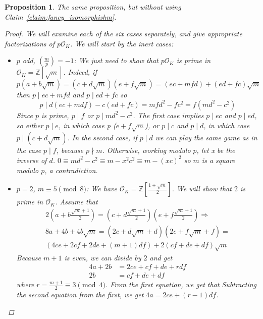 \documentclass[11pt]{article}
\newtheorem{prop}{Proposition}
\theoremstyle{definition}
\begin{document}
    \begin{prop}
        The same proposition, but without using Claim~\ref{claim:fancy_isomorphishm}.
        \begin{proof}
            We will examine each of the six cases separately, and give appropriate factorizations of $p\mathcal{O}_K$.
            We will start by the inert cases:
            \begin{itemize}

                \item $p$ odd, $\left( \frac{m}{p} \right) = -1$: We just need to show that $p \mathcal{O}_K$ is prime in $\mathcal{O}_K = \mathbb{Z}\left[\sqrt {m}\right]$.
                Indeed, if \[p\left(a+b\sqrt {m}\right) = \left(c+d\sqrt{m}\right)\left(e+f\sqrt{m}\right) = (ec + mfd) + (ed + fc)\sqrt{m}\]
                then $p \mid ec + mfd$ and $p \mid ed + fc$ so
                \[p \mid d(ec+mdf) - c(ed+fc) = mfd^2 - fc^2 = f(md^2 - c^2)\]
                Since $p$ is prime, $p \mid f$ or $p \mid md^2 - c^2$.
                The first case implies $p \mid ec$ and $p \mid ed$, so either $p \mid e$,
                in which case p \mid ($e + f \sqrt {m}$), or $p \mid c$ and $p \mid d$,
                in which case $p \mid \left(c + d \sqrt {m}\right)$.
                In the second case, if $p \mid d$ we can play the same game as in the case $p \mid f$, because $p \nmid m$.
                Otherwise, working modulo $p$, let x be the inverse of $d$.
                $0 \equiv md^2-c^2 \equiv m - x^2c^2 \equiv m - (xc)^2$ so $m$ is a square modulo $p$, a contradiction.

                \item $p=2$, $m \equiv 5 \pmod 8$: We have $\mathcal{O}_K = \mathbb{Z}\left[\frac{1+\sqrt {m}}{2}\right]$.
                We will show that $2$ is prime in $\mathcal{O}_K$.
                Assume that
                \begin{gather}
                    2\left(a+b\frac{\sqrt {m}+1}{2}\right) = \left(c+d\frac{\sqrt {m}+1}{2}\right)\left(e+f\frac{\sqrt {m}+1}{2}\right) \Rightarrow \nonumber \\
                    8a + 4b + 4b\sqrt {m} =
                    (2c+d\sqrt {m}+d)(2e+f\sqrt {m}+f) = \nonumber \\
                    (4ce + 2cf + 2de + (m+1)df) + 2(cf+de+df)\sqrt {m} \nonumber
                \end{gather}
                Because $m+1$ is even, we can divide by $2$ and get
                \begin{align*}
                    4a + 2b &= 2ce + cf + de + rdf \nonumber \\
                    2b &= cf+ de + df \nonumber
                \end{align*}
                where $r = \frac{m+1}{2} \equiv 3 \pmod 4$.
                From the first equation, we get that
                Subtracting the second equation from the first, we get
                $4a = 2ce + (r-1)df$.
            \end{itemize}
        \end{proof}
    \end{prop}
\end{document}
